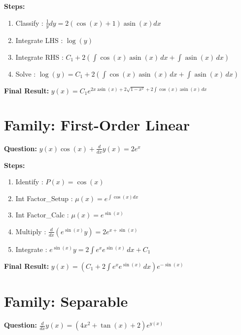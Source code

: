 \documentclass{article}
\begin{document}
\textbf{Steps:}
\begin{enumerate}
\item Classify :  $\frac{1}{y} dy = 2 \left(\cos{\left(x \right)} + 1\right) \operatorname{asin}{\left(x \right)} dx$
\item Integrate LHS :  $\log{\left(y \right)}$
\item Integrate RHS :  $C_{1} + 2 \left(\int \cos{\left(x \right)} \operatorname{asin}{\left(x \right)}\, dx + \int \operatorname{asin}{\left(x \right)}\, dx\right)$
\item Solve :  $\log{\left(y \right)} = C_{1} + 2 \left(\int \cos{\left(x \right)} \operatorname{asin}{\left(x \right)}\, dx + \int \operatorname{asin}{\left(x \right)}\, dx\right)$
\end{enumerate}
\textbf{Final Result:} $y{\left(x \right)} = C_{1} e^{2 x \operatorname{asin}{\left(x \right)} + 2 \sqrt{1 - x^{2}} + 2 \int \cos{\left(x \right)} \operatorname{asin}{\left(x \right)}\, dx}$

\section*{Family: First-Order Linear}
\textbf{Question:} $y{\left(x \right)} \cos{\left(x \right)} + \frac{d}{d x} y{\left(x \right)} = 2 e^{x}$

\textbf{Steps:}
\begin{enumerate}
\item Identify :  $P(x) = \cos{\left(x \right)}$
\item Int Factor_Setup :  $\mu(x) = e^{\int \cos{\left(x \right)} dx}$
\item Int Factor_Calc :  $\mu(x) = e^{\sin{\left(x \right)}}$
\item Multiply :  $\frac{d}{dx}(e^{\sin{\left(x \right)}}y) = 2 e^{x + \sin{\left(x \right)}}$
\item Integrate :  $e^{\sin{\left(x \right)}}y = 2 \int e^{x} e^{\sin{\left(x \right)}}\, dx + C_1$
\end{enumerate}
\textbf{Final Result:} $y{\left(x \right)} = \left(C_{1} + 2 \int e^{x} e^{\sin{\left(x \right)}}\, dx\right) e^{- \sin{\left(x \right)}}$

\section*{Family: Separable}
\textbf{Question:} $\frac{d}{d x} y{\left(x \right)} = \left(4 x^{2} + \tan{\left(x \right)} + 2\right) e^{y{\left(x \right)}}$
\end{document}
